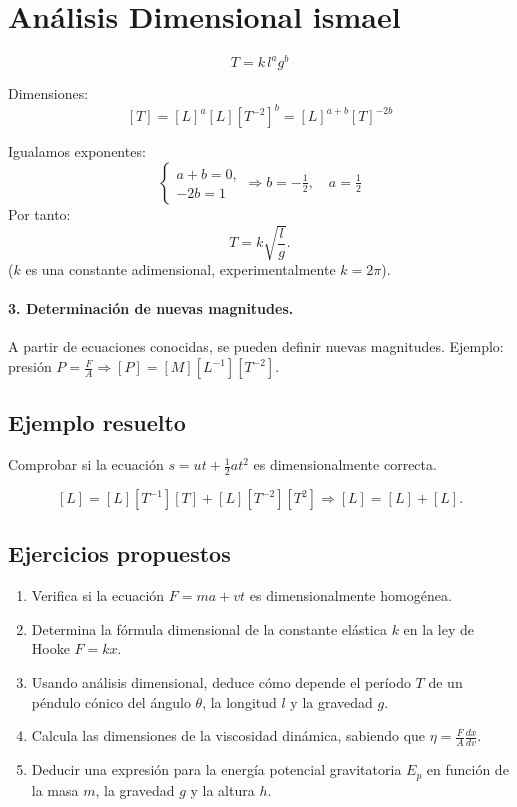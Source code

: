 \section{Análisis Dimensional ismael} 
\[
T = k\, l^a g^b
\]

Dimensiones:
\[
[T] = [L]^a [L][T^{-2}]^b = [L]^{a+b}[T]^{-2b}
\]

Igualamos exponentes:
\[
\begin{cases}
a + b = 0,\\
-2b = 1
\end{cases}
\Rightarrow b = -\tfrac{1}{2}, \quad a = \tfrac{1}{2}
\]
Por tanto:
\[
T = k \sqrt{\frac{l}{g}}.
\]
(\(k\) es una constante adimensional, experimentalmente \(k = 2\pi\)).

\paragraph{3. Determinación de nuevas magnitudes.}
A partir de ecuaciones conocidas, se pueden definir nuevas magnitudes.  
Ejemplo: presión \(P = \frac{F}{A} \Rightarrow [P] = [M][L^{-1}][T^{-2}]\).

\subsection{Ejemplo resuelto}
Comprobar si la ecuación \( s = ut + \tfrac{1}{2}at^2 \) es dimensionalmente correcta.

\[
[L] = [L][T^{-1}][T] + [L][T^{-2}][T^2] \Rightarrow [L] = [L] + [L].
\]
\subsection{Ejercicios propuestos}
\begin{enumerate}
    \item Verifica si la ecuación \( F = m a + v t \) es dimensionalmente homogénea.
    \item Determina la fórmula dimensional de la constante elástica \(k\) en la ley de Hooke \(F = kx\).
    \item Usando análisis dimensional, deduce cómo depende el período \(T\) de un péndulo cónico del ángulo \(\theta\), la longitud \(l\) y la gravedad \(g\).
    \item Calcula las dimensiones de la viscosidad dinámica, sabiendo que \( \eta = \frac{F}{A}\frac{dx}{dv} \).
    \item Deducir una expresión para la energía potencial gravitatoria \(E_p\) en función de la masa \(m\), la gravedad \(g\) y la altura \(h\).
\end{enumerate}
